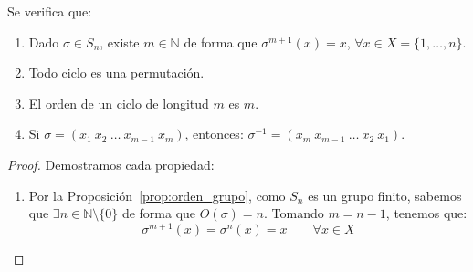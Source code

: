 \begin{prop}\label{prop:propiedades_sn}
    Se verifica que:
    \begin{enumerate}
        \item Dado $\sigma\in S_n$, existe $m\in \mathbb{N}$ de forma que $\sigma^{m+1}(x) = x$, $\forall x\in X=\{1,\ldots,n\}$.
        \item Todo ciclo es una permutación.
        \item El orden de un ciclo de longitud $m$ es $m$.
        \item Si $\sigma = (x_1\ x_2\ \ldots\ x_{m-1}\ x_m)$, entonces: $\sigma^{-1} = (x_m\ x_{m-1}\ \ldots\ x_2\ x_1)$.
    \end{enumerate}
    \begin{proof}
        Demostramos cada propiedad:
        \begin{enumerate}
            \item Por la Proposición~\ref{prop:orden_grupo}, como $S_n$ es un grupo finito, sabemos que $\exists n\in \mathbb{N}\setminus\{0\}$ de forma que $O(\sigma)=n$. Tomando $m=n-1$, tenemos que:
                \begin{equation*}
                    \sigma^{m+1}(x) = \sigma^{n}(x) = x \qquad \forall x\in X
                \end{equation*}


\end{enumerate}
\end{proof}
\end{prop}

